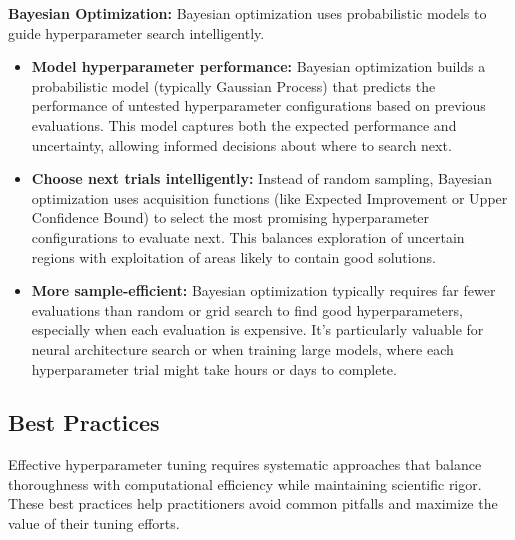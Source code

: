 \textbf{Bayesian Optimization:} Bayesian optimization uses probabilistic models to guide hyperparameter search intelligently.
\begin{itemize}
    \item \textbf{Model hyperparameter performance:} Bayesian optimization builds a probabilistic model (typically Gaussian Process) that predicts the performance of untested hyperparameter configurations based on previous evaluations. This model captures both the expected performance and uncertainty, allowing informed decisions about where to search next.
    
    \item \textbf{Choose next trials intelligently:} Instead of random sampling, Bayesian optimization uses acquisition functions (like Expected Improvement or Upper Confidence Bound) to select the most promising hyperparameter configurations to evaluate next. This balances exploration of uncertain regions with exploitation of areas likely to contain good solutions.
    
    \item \textbf{More sample-efficient:} Bayesian optimization typically requires far fewer evaluations than random or grid search to find good hyperparameters, especially when each evaluation is expensive. It's particularly valuable for neural architecture search or when training large models, where each hyperparameter trial might take hours or days to complete.
\end{itemize}

\subsection{Best Practices}

Effective hyperparameter tuning requires systematic approaches that balance thoroughness with computational efficiency while maintaining scientific rigor. These best practices help practitioners avoid common pitfalls and maximize the value of their tuning efforts.

